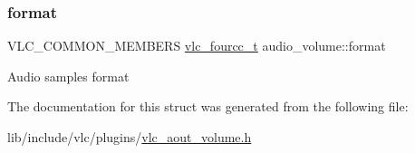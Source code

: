 \subsubsection{\texorpdfstring{format}{format}}
{\footnotesize\ttfamily V\+L\+C\+\_\+\+C\+O\+M\+M\+O\+N\+\_\+\+M\+E\+M\+B\+E\+RS \hyperlink{vlc__common_8h_af49f89d0f752bc9cff142e43b1bd634d}{vlc\+\_\+fourcc\+\_\+t} audio\+\_\+volume\+::format}

Audio samples format 

The documentation for this struct was generated from the following file\+:\begin{DoxyCompactItemize}
\item 
lib/include/vlc/plugins/\hyperlink{vlc__aout__volume_8h}{vlc\+\_\+aout\+\_\+volume.\+h}\end{DoxyCompactItemize}

